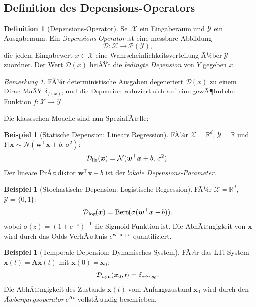 ﻿\documentclass[12pt, a4paper]{article}
\theoremstyle{definition}
\newtheorem{definition}[theorem]{Definition}
\newtheorem{example}[theorem]{Beispiel}
\theoremstyle{remark}
\newtheorem{remark}[theorem]{Bemerkung}
\newcommand{\R}{\mathbb{R}}
\newcommand{\sigmoid}{\sigma}
\newcommand{\vw}{\bm{w}}
\newcommand{\vx}{\bm{x}}
\newcommand{\vA}{\bm{A}}
\newcommand{\T}{\top}
\begin{document}
\subsection{Definition des Depensions-Operators}

\begin{definition}[Depensions-Operator]
\label{def:depop}
Sei $\mathcal{X}$ ein Eingaberaum und $\mathcal{Y}$ ein Ausgaberaum. Ein
\emph{Depensions-Operator} ist eine messbare Abbildung
\begin{equation}
  \mathcal{D} : \mathcal{X} \to \mathcal{P}(\mathcal{Y}),
  \label{eq:depop}
\end{equation}
die jedem Eingabewert $x \in \mathcal{X}$ eine Wahrscheinlichkeitsverteilung Ã¼ber
$\mathcal{Y}$ zuordnet. Der Wert $\mathcal{D}(x)$ heiÃŸt die
\emph{bedingte Depension} von $Y$ gegeben $x$.
\end{definition}

\begin{remark}
FÃ¼r deterministische Ausgaben degeneriert $\mathcal{D}(x)$ zu einem Dirac-MaÃŸ
$\delta_{f(x)}$, und die Depension reduziert sich auf eine gewÃ¶hnliche Funktion
$f: \mathcal{X} \to \mathcal{Y}$.
\end{remark}

Die klassischen Modelle sind nun SpezialfÃ¤lle:

\begin{example}[Statische Depension: Lineare Regression]
  FÃ¼r $\mathcal{X} = \R^d$, $\mathcal{Y} = \R$ und $Y|\vx \sim \mathcal{N}(\vw^\T\vx + b,\,\sigma^2)$:
  \[
    \mathcal{D}_{\rm lin}(\vx) = \mathcal{N}(\vw^\T\vx + b,\,\sigma^2).
  \]
  Der lineare PrÃ¤diktor $\vw^\T\vx + b$ ist der \emph{lokale Depensions-Parameter}.
\end{example}

\begin{example}[Stochastische Depension: Logistische Regression]
\label{ex:logdep}
  FÃ¼r $\mathcal{X} = \R^d$, $\mathcal{Y} = \{0,1\}$:
  \[
    \mathcal{D}_{\rm log}(\vx) = \mathrm{Bern}\!\bigl(\sigmoid(\vw^\T\vx + b)\bigr),
  \]
  wobei $\sigmoid(z) = (1+e^{-z})^{-1}$ die Sigmoid-Funktion ist. Die AbhÃ¤ngigkeit
  von $\vx$ wird durch das Odds-VerhÃ¤ltnis $e^{\vw^\T\vx+b}$ quantifiziert.
\end{example}

\begin{example}[Temporale Depension: Dynamisches System]
\label{ex:tempdep}
  FÃ¼r das LTI-System $\dot{\vx}(t) = \vA\vx(t)$ mit $\vx(0) = \vx_0$:
  \[
    \mathcal{D}_{\rm dyn}(\vx_0, t) = \delta_{e^{\vA t}\vx_0}.
  \]
  Die AbhÃ¤ngigkeit des Zustands $\vx(t)$ vom Anfangszustand $\vx_0$ wird durch den
  \emph{Ãœbergangsoperator} $e^{\vA t}$ vollstÃ¤ndig beschrieben.
\end{example}
\end{document}
